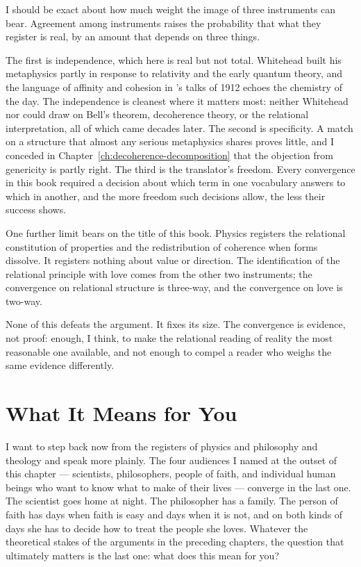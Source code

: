 I should be exact about how much weight the image of three instruments can
bear.  Agreement among instruments
raises the probability that what they register is real, by an amount that
depends on three things.

The first is independence, which here is real but not total.  Whitehead built
his metaphysics partly in response to relativity and the early quantum theory,
and the language of affinity and cohesion in \AbdulBaha's talks of 1912 echoes
the chemistry of the day.  The independence is cleanest where it matters most:
neither Whitehead nor \AbdulBaha could draw on Bell's theorem, decoherence
theory, or the relational interpretation, all of which came decades later.  The
second is specificity.  A match on a structure that almost any serious
metaphysics shares proves little, and I conceded in
Chapter~\ref{ch:decoherence-decomposition} that the objection from genericity
is partly right.  The third is the translator's freedom.  Every convergence in
this book required a decision about which term in one vocabulary answers to
which in another, and the more freedom such decisions allow, the less their
success shows.

One further limit bears on the title of this book.  Physics registers the
relational constitution of properties and the redistribution of coherence when
forms dissolve.  It registers nothing about value or direction.  The
identification of the relational principle with love comes from the other two
instruments; the convergence on relational structure is three-way, and the
convergence on love is two-way.

None of this defeats the argument.  It fixes its size.  The convergence is
evidence, not proof: enough, I think, to make the relational reading of reality
the most reasonable one available, and not enough to compel a reader who weighs
the same evidence differently.


\section{What It Means for You}
\label{sec:ch15-you}

I want to step back now from the registers of physics and philosophy and
theology and speak more plainly.  The four audiences I named at the outset of
this chapter --- scientists, philosophers, people of faith, and individual human
beings who want to know what to make of their lives --- converge in the last
one.  The scientist goes home at night.  The philosopher has a family.  The
person of faith has days when faith is easy and days when it is not, and on
both kinds of days she has to decide how to treat the people she loves.  Whatever
the theoretical stakes of the arguments in the preceding chapters, the question
that ultimately matters is the last one: what does this mean for you?

